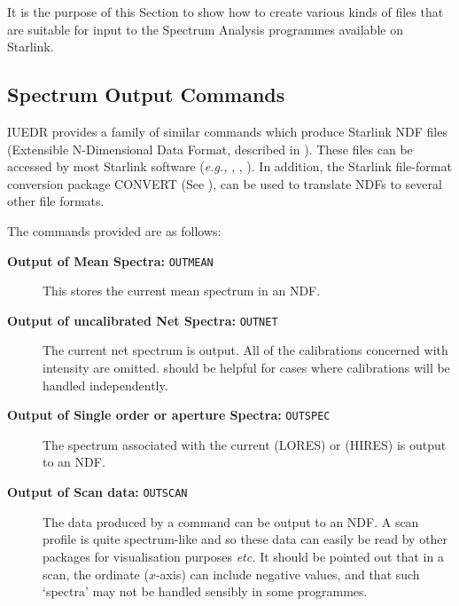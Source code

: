 It is the purpose of this Section to show how to create various kinds of
files that are suitable for input to the Spectrum Analysis programmes
available on Starlink.


\subsection{Spectrum Output Commands}

IUEDR provides a family of similar commands which produce Starlink NDF files
(Extensible N-Dimen\-sional Data Format, described in
)\@.  These files
can be accessed by most Starlink software ({\it{e.g.,}} ,
,
)\@.
In addition, the Starlink file-format conversion package CONVERT (See
),
can be used to translate NDFs to several other file formats.

The commands provided are as follows:

\begin{description}

\item [{\bf Output of Mean Spectra:} {\tt OUTMEAN}]
      This stores the current mean spectrum in an NDF\@.

\item [{\bf Output of uncalibrated Net Spectra:} {\tt OUTNET}]
      The current net spectrum is output.
      All of the calibrations concerned with intensity are omitted.
       should be helpful for
      cases where calibrations will be handled independently.

\item [{\bf Output of Single order or aperture Spectra:} {\tt OUTSPEC}]
      The spectrum
      associated with the current 
      (LORES) or  (HIRES) is output to an
      NDF\@.

\item [{\bf Output of Scan data:} {\tt OUTSCAN}]
      The data produced by a  command can be
      output to an NDF\@.  A scan profile is quite
      spectrum-like and so these data can easily be read by other packages for
      visualisation purposes {\it etc.}  It should be pointed out that in a
      scan, the ordinate ($x$-axis) can include negative values, and that such
      `spectra' may not be handled sensibly in some programmes.

\end{description}

